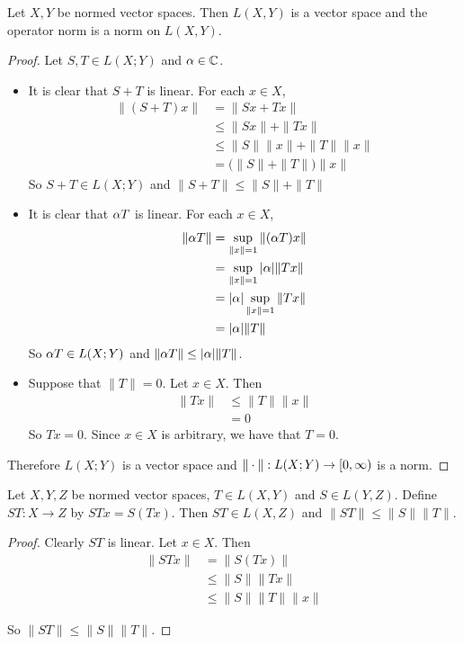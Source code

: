 \documentclass{book}
\begin{document}
	\begin{ex} 
		Let $X, Y$ be normed vector spaces. Then $L(X, Y)$ is a vector space and the operator norm is a norm on $L(X,Y)$.
	\end{ex}
	
	\begin{proof}
		Let $S,T \in L(X;Y)$ and $\alpha \in \mathbb{C}$. 
		\begin{itemize}
			\item It is clear that $S+T$ is linear. For each $x \in X$,
			\begin{align*}
				\|(S+T)x \|
				&= \|Sx+Tx \|\\
				& \leq \|Sx \|+ \|Tx \|\\
				&\leq \|S \|\|x \|+ \|T \|\|x \|\\
				&= \big(\|S \|+ \|T \|\big) \|x \|
			\end{align*}
			So $S+T \in L(X;Y)$ and $\|S+T\|\leq \|S \|+ \|T \|$
			\item It is clear that $\alpha T$ is linear. For each $x \in X$,
			\begin{align*}
				\|\alpha T \|
				&= \sup_{\|x \|=1} \|(\alpha T)x \|\\
				&= \sup_{\|x \|=1} \vert \alpha \vert \|Tx \|\\
				&=\vert \alpha \vert \sup_{\|x \|=1} \|Tx \|\\
				&=\vert \alpha \vert \|T \|
			\end{align*} 
			So $\alpha T \in L(X;Y)$ and $\|\alpha T\| \leq |\alpha| \|T\|$.
			\item Suppose that $\|T\| = 0$.  Let $x \in X$. Then  
			\begin{align*}
				\|T x\|
				& \leq \|T \|\|x \| \\
				& = 0
			\end{align*}
			So $Tx=0$. Since $x \in X$ is arbitrary, we have that $T=0$. 
		\end{itemize}
		Therefore $L(X;Y)$ is a vector space and $\|\cdot\|: L(X;Y) \rightarrow [0,\infty)$ is a norm.
	\end{proof}
	
	\begin{ex} 
		Let $X,Y,Z$ be normed vector spaces, $T \in L(X,Y)$ and $S \in L(Y,Z)$. Define $ST:X \rightarrow Z$ by $STx = S(Tx)$. Then $ST \in L(X,Z)$ and $\|ST \|\leq \|S \|\|T \|$. 
	\end{ex}
	
	\begin{proof}
		Clearly $ST$ is linear. Let $x \in X$. Then 
		\begin{align*}
			\|ST x \|
			& = \|S(Tx) \|\\
			& \leq \|S \|\|Tx \|\\
			& \leq \|S \|\|T \|\|x \|
		\end{align*}
		
		So $\|ST \|\leq \|S \|\|T \|$.
	\end{proof}
	
\end{document}

